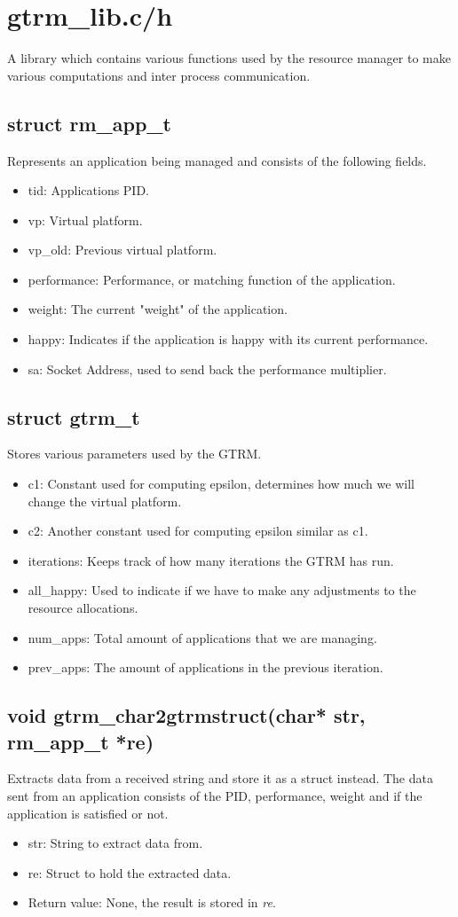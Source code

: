 \documentclass[nobiblatex]{LTHthesis}
\begin{document}
\section{gtrm\_lib.c/h}
A library which contains various functions used by the resource manager to make various computations and inter process communication.

\subsection{struct rm\_app\_t}
Represents an application being managed and consists of the following fields.
\begin{itemize}
\item tid: Applications PID.
\item vp: Virtual platform.
\item vp\_old: Previous virtual platform.
\item performance: Performance, or matching function of the application.
\item weight: The current "weight" of the application.
\item happy: Indicates if the application is happy with its current performance.
\item sa: Socket Address, used to send back the performance multiplier.
\end{itemize}

\subsection{struct gtrm\_t}
Stores various parameters used by the GTRM.
\begin{itemize}
\item c1: Constant used for computing epsilon, determines how much we will change the virtual platform.
\item c2: Another constant used for computing epsilon similar as c1.
\item iterations: Keeps track of how many iterations the GTRM has run.
\item all\_happy: Used to indicate if we have to make any adjustments to the resource allocations.
\item num\_apps: Total amount of applications that we are managing.
\item prev\_apps: The amount of applications in the previous iteration.
\end{itemize}

\subsection{void gtrm\_char2gtrmstruct(char* str, rm\_app\_t *re)}
Extracts data from a received string and store it as a struct instead. The data sent from an application consists of the PID, performance, weight and if the application is satisfied or not.
\begin{itemize} 
\item str: String to extract data from.
\item re: Struct to hold the extracted data.
\item Return value: None, the result is stored in \emph{re}.
\end{itemize}
\end{document}
